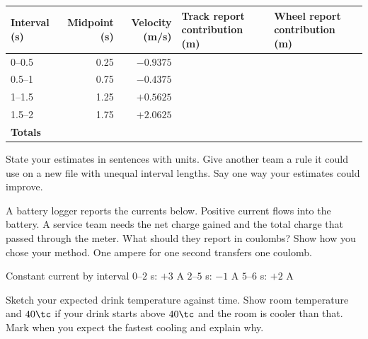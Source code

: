 {\setlength{\tabcolsep}{8pt}\renewcommand{\arraystretch}{1.31}
\begin{tabularx}{\linewidth}{@{}l r r >{\raggedright\arraybackslash}X >{\raggedright\arraybackslash}X@{}}\toprule
Interval (s) & Midpoint (s) & Velocity (m/s) & Track report contribution (m) & Wheel report contribution (m)\\\midrule
0--0.5 & 0.25 & \(-0.9375\) & & \\
0.5--1 & 0.75 & \(-0.4375\) & & \\
1--1.5 & 1.25 & \(+0.5625\) & & \\
1.5--2 & 1.75 & \(+2.0625\) & & \\
\midrule
\textbf{Totals} &&&&\\\bottomrule
\end{tabularx}}

State your estimates in sentences with units. Give another team a rule it could use on a new file with unequal interval lengths. Say one way your estimates could improve.

A battery logger reports the currents below. Positive current flows into the battery. A service team needs the net charge gained and the total charge that passed through the meter. What should they report in coulombs? Show how you chose your method. One ampere for one second transfers one coulomb.

{\sffamily\small\color{Muted}Constant current by interval \hfill \(0\)--\(2\) s: \(+3\) A \hfill \(2\)--\(5\) s: \(-1\) A \hfill \(5\)--\(6\) s: \(+2\) A\par}

\clearpage
{}
\namefields


Sketch your expected drink temperature against time. Show room temperature and \(40\tc\) if your drink starts above \(40\tc\) and the room is cooler than that. Mark when you expect the fastest cooling and explain why.
\begin{center}
\end{center}

